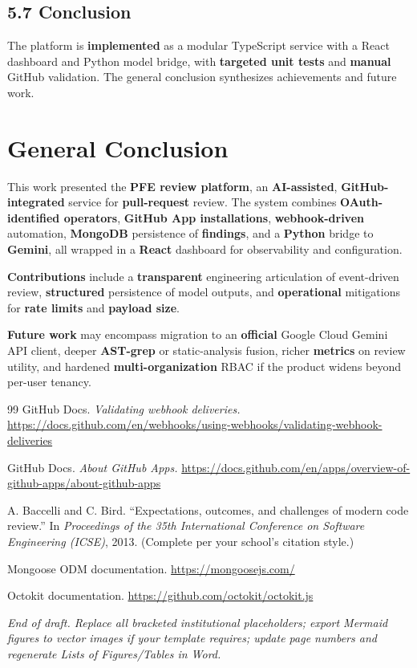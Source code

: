 \documentclass[11pt,a4paper]{report}
\begin{document}
\section{5.7 Conclusion}


The platform is \textbf{implemented} as a modular TypeScript service with a React dashboard and Python model bridge, with \textbf{targeted unit tests} and \textbf{manual} GitHub validation. The general conclusion synthesizes achievements and future work.



\chapter*{General Conclusion}


This work presented the \textbf{PFE review platform}, an \textbf{AI-assisted}, \textbf{GitHub-integrated} service for \textbf{pull-request} review. The system combines \textbf{OAuth-identified operators}, \textbf{GitHub App installations}, \textbf{webhook-driven} automation, \textbf{MongoDB} persistence of \textbf{findings}, and a \textbf{Python} bridge to \textbf{Gemini}, all wrapped in a \textbf{React} dashboard for observability and configuration.


\textbf{Contributions} include a \textbf{transparent} engineering articulation of event-driven review, \textbf{structured} persistence of model outputs, and \textbf{operational} mitigations for \textbf{rate limits} and \textbf{payload size}.


\textbf{Future work} may encompass migration to an \textbf{official} Google Cloud Gemini API client, deeper \textbf{AST-grep} or static-analysis fusion, richer \textbf{metrics} on review utility, and hardened \textbf{multi-organization} RBAC if the product widens beyond per-user tenancy.



\begin{thebibliography}{99}
GitHub Docs. \textit{Validating webhook deliveries.} \url{https://docs.github.com/en/webhooks/using-webhooks/validating-webhook-deliveries}

GitHub Docs. \textit{About GitHub Apps.} \url{https://docs.github.com/en/apps/overview-of-github-apps/about-github-apps}

A. Baccelli and C. Bird. “Expectations, outcomes, and challenges of modern code review.” In \textit{Proceedings of the 35th International Conference on Software Engineering (ICSE)}, 2013. (Complete per your school’s citation style.)

Mongoose ODM documentation. \url{https://mongoosejs.com/}

Octokit documentation. \url{https://github.com/octokit/octokit.js}

\end{thebibliography}


\textit{End of draft. Replace all bracketed institutional placeholders; export Mermaid figures to vector images if your template requires; update page numbers and regenerate Lists of Figures/Tables in Word.}
\end{document}
